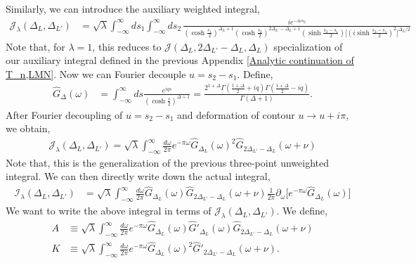 \documentclass[11pt]{article}
\newcommand{\p}{\partial}
\newcommand{\nn}{\nonumber}
\newcommand{\lb}{\left(}
\newcommand{\rb}{\right)}
\begin{document}
Similarly, we can introduce the auxiliary weighted integral,
\begin{align}
    \mathcal{J}_\lambda(\Delta_L,\Delta_{L'}) &= \sqrt \lambda \int_{-\infty}^{\infty}ds_1 \int_{-\infty}^{\infty} ds_2 \,  
    \frac{ie^{-i\nu s_2} }{\lb\cosh\frac{s_1}{2}\rb^{\Delta_L+1}\lb\cosh\frac{s_2}{2}\rb^{2\Delta_{L'}-\Delta_L+1}\lb\sinh\frac{s_2-s_1}{2}\rb\Big[\lb i\sinh\frac{s_2 - s_1}{2}\rb^2\Big]^{\Delta_L/2}}
\end{align}
Note that, for $\lambda = 1$, this reduces to $\mathcal{J}(\Delta_L,2\Delta_{L'}-\Delta_L,\Delta_L)$ specialization of our auxiliary integral defined in the previous Appendix \ref{Analytic continuation of T_n,LMN}. Now we can Fourier decouple $u = s_2 - s_1$. Define,
\begin{align}
    \hat G_\Delta(\omega) &= \int_{-\infty}^\infty ds \frac{e^{iqs}}{\lb\cosh\frac{s}{2}\rb^{\Delta +1}}=\frac{2^{1+\Delta}\Gamma\lb\frac{1+\Delta}{2}+ iq\rb\Gamma\lb\frac{1+\Delta}{2}-iq\rb}{\Gamma\lb\Delta +1\rb}.
\end{align}
After Fourier decoupling of $u = s_2 - s_1$ and deformation of contour $u \to u + i\pi$, we obtain,
\begin{align}
    \mathcal{J}_\lambda(\Delta_L,\Delta_{L'}) = \sqrt \lambda \int_{-\infty}^\infty \frac{d\omega}{2\pi} e^{-\pi \omega} \hat G_{\Delta_L}(\omega)^2 \hat G_{2\Delta_{L'}-\Delta_L}(\omega+\nu)
\end{align}
Note that, this is the generalization of the previous three-point unweighted integral. We can then directly write down the actual integral,
\begin{align}
    \mathcal{I}_\lambda(\Delta_L,\Delta_{L'}) &= \sqrt \lambda \int_{-\infty}^\infty \frac{d\omega}{2\pi}  \hat G_{\Delta_L}(\omega) \hat G_{2\Delta_{L'}-\Delta_L}(\omega+\nu) \frac{1}{2\pi}\p_\omega \Big[e^{-\pi \omega}\hat G_{\Delta_L}(\omega)\Big]
\end{align}
We want to write the above integral in terms of $\mathcal{J}_\lambda(\Delta_L,\Delta_{L'})$. We define,
\begin{align}
    A &\equiv \sqrt \lambda \int_{-\infty}^\infty \frac{d\omega}{2\pi} e^{-\pi \omega} \hat G_{\Delta_L}(\omega)\hat G'_{\Delta_L}(\omega) \hat G_{2\Delta_{L'}-\Delta_L}(\omega+\nu) \\
    K &\equiv \sqrt \lambda \int_{-\infty}^\infty \frac{d\omega}{2\pi} e^{-\pi \omega} \hat G_{\Delta_L}(\omega)^2\hat G'_{2\Delta_{L'}-\Delta_L}(\omega+\nu).
\end{align}
\end{document}
